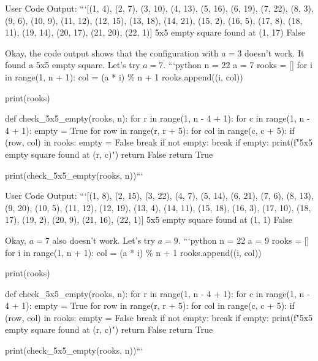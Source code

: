 \endgroup

\begin{prompt}{User}
Code Output:
```[(1, 4), (2, 7), (3, 10), (4, 13), (5, 16), (6, 19), (7, 22), (8, 3), (9, 6), (10, 9), (11, 12), (12, 15), (13, 18), (14, 21), (15, 2), (16, 5), (17, 8), (18, 11), (19, 14), (20, 17), (21, 20), (22, 1)]
5x5 empty square found at (1, 17)
False
\end{prompt}

\begingroup\raggedleft
\begin{geminils}{\geminiflheader}
Okay, the code output shows that the configuration with $a=3$ doesn't work. It found a 5x5 empty square. Let's try $a=7$.
```python
n = 22
a = 7
rooks = []
for i in range(1, n + 1):
    col = (a * i) \% n + 1
    rooks.append((i, col))
    
    print(rooks)

def check_5x5_empty(rooks, n):
    for r in range(1, n - 4 + 1):
        for c in range(1, n - 4 + 1):
            empty = True
            for row in range(r, r + 5):
                for col in range(c, c + 5):
                    if (row, col) in rooks:
                        empty = False
                        break
                if not empty:
                    break
            if empty:
                print(f"5x5 empty square found at ({r}, {c})")
                return False
    return True

print(check_5x5_empty(rooks, n))```
\end{geminils}
\endgroup

\begin{prompt}{User}
Code Output:
```[(1, 8), (2, 15), (3, 22), (4, 7), (5, 14), (6, 21), (7, 6), (8, 13), (9, 20), (10, 5), (11, 12), (12, 19), (13, 4), (14, 11), (15, 18), (16, 3), (17, 10), (18, 17), (19, 2), (20, 9), (21, 16), (22, 1)]
5x5 empty square found at (1, 1)
False
\end{prompt}

\begingroup\raggedleft
\begin{geminils}{\geminiflheader}
Okay, $a=7$ also doesn't work. Let's try $a=9$.
```python
n = 22
a = 9
rooks = []
for i in range(1, n + 1):
    col = (a * i) \% n + 1
    rooks.append((i, col))
    
    print(rooks)

def check_5x5_empty(rooks, n):
    for r in range(1, n - 4 + 1):
        for c in range(1, n - 4 + 1):
            empty = True
            for row in range(r, r + 5):
                for col in range(c, c + 5):
                    if (row, col) in rooks:
                        empty = False
                        break
                if not empty:
                    break
            if empty:
                print(f"5x5 empty square found at ({r}, {c})")
                return False
    return True

print(check_5x5_empty(rooks, n))```
\end{geminils}
\endgroup

